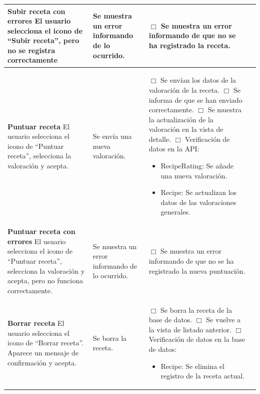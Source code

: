 \begin{center}
\begin{longtable}{|p{3.75cm}|p{3.5cm}|p{5.25cm}|p{1.5cm}|}
    \textbf{Subir receta con errores}\newline
    El usuario selecciona el icono de ``Subir receta'', pero no se registra
    correctamente &
    Se muestra un error informando de lo ocurrido. &
    $\Box$ Se muestra un error informando de que no se ha registrado la
    receta. & \\ \hline

    \textbf{Puntuar receta}\newline
    El usuario selecciona el icono de ``Puntuar receta'', selecciona la
    valoración y acepta. &
    Se envía una nueva valoración. &
    $\Box$ Se envían los datos de la valoración de la receta.\newline
    $\Box$ Se informa de que se han enviado correctamente.\newline
    $\Box$ Se muestra la actualización de la valoración en la vista de
    detalle.\newline
    $\Box$ Verificación de datos en la API:
    \begin{itemize}
    \item RecipeRating: Se añade una nueva valoración.
    \item Recipe: Se actualizan los datos de las valoraciones generales.
    \end{itemize}
    & \\ \hline
    
    \textbf{Puntuar receta con errores}\newline
    El usuario selecciona el icono de ``Puntuar receta'', selecciona la
    valoración y acepta, pero no funciona correctamente. &
    Se muestra un error informando de lo ocurrido. &
    $\Box$ Se muestra un error informando de que no se ha registrado la nueva
    puntuación.& \\ \hline

    \textbf{Borrar receta}\newline
    El usuario selecciona el icono de ``Borrar receta''. Aparece un mensaje de
    confirmación y acepta. &
    Se borra la receta. &
    $\Box$ Se borra la receta de la base de datos.\newline
    $\Box$ Se vuelve a la vista de listado anterior. \newline
    $\Box$ Verificación de datos en la base de datos:
    \begin{itemize}
    \item Recipe: Se elimina el registro de la receta actual.
    \end{itemize}
    & \\ \hline
    

\end{longtable}
\end{center}
